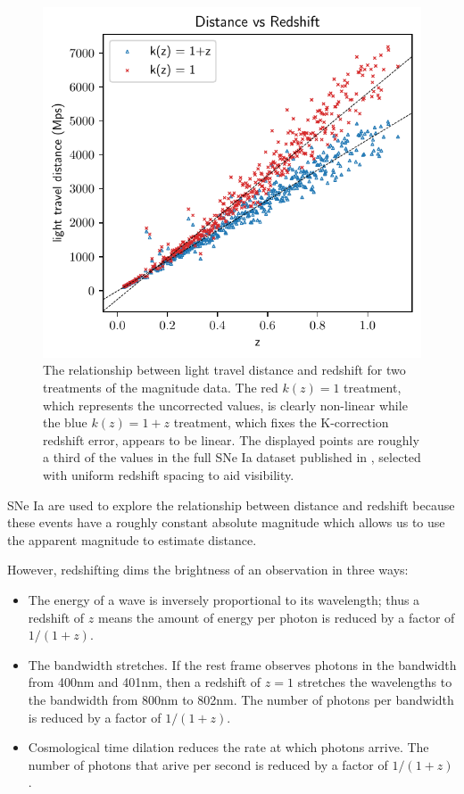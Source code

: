 \documentclass[aps,prl,reprint,amsmath,floatfix]{revtex4-2}
\begin{document}
\begin{figure}
  \includegraphics[width=\columnwidth]{distance_vs_redshift.pdf}
  \caption{The relationship between light travel distance and redshift for two
  treatments of the magnitude data. The red $k(z) = 1$ treatment, which represents
  the uncorrected values, is clearly non-linear while the blue $k(z) = 1 + z$
  treatment, which fixes the K-correction redshift error, appears to be linear.
  The displayed points are roughly a third of the values in the full SNe Ia
  dataset published in \citet{abbott2024}, selected with uniform redshift
  spacing to aid visibility. }
  \label{fig:distance_vs_redshift}
\end{figure}

SNe Ia are used to explore the relationship between distance and redshift because
these events have a roughly constant absolute magnitude which allows us to use
the apparent magnitude to estimate distance.

However, redshifting dims the brightness of an observation in three ways:

\begin{itemize}
  \item The energy of a wave is inversely proportional to its wavelength; thus a
  redshift of $z$ means the amount of energy per photon is reduced by a factor
  of ${1 / (1+z)}$.

  \item The bandwidth stretches. If the rest frame observes photons in the
  bandwidth from 400nm and 401nm, then a redshift of ${z = 1}$ stretches the
  wavelengths to the bandwidth from 800nm to 802nm. The number of photons per
  bandwidth is reduced by a factor of ${1 / (1+z)}$.

  \item Cosmological time dilation reduces the rate at which photons arrive.
  The number of photons that arive per second is reduced by a factor of ${1 / (1+z)}$.
\end{itemize}
\end{document}
